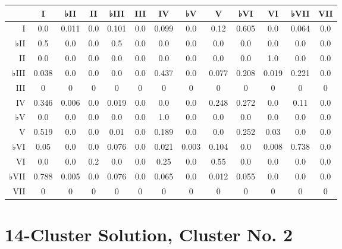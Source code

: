 \begin{table}[htbp]
\begin{minipage}{\linewidth}
\setlength{\tymax}{0.5\linewidth}
\centering
\small
\begin{tabulary}{\textwidth}{@{}RCCCCCCCCCCCC@{}} \toprule
&I&♭II&II&♭III&III&IV&♭V&V&♭VI&VI&♭VII&VII\\
\midrule
I&0.0&0.011&0.0&0.101&0.0&0.099&0.0&0.12&0.605&0.0&0.064&0.0\\
♭II&0.5&0.0&0.0&0.5&0.0&0.0&0.0&0.0&0.0&0.0&0.0&0.0\\
II&0.0&0.0&0.0&0.0&0.0&0.0&0.0&0.0&0.0&1.0&0.0&0.0\\
♭III&0.038&0.0&0.0&0.0&0.0&0.437&0.0&0.077&0.208&0.019&0.221&0.0\\
III&0&0&0&0&0&0&0&0&0&0&0&0\\
IV&0.346&0.006&0.0&0.019&0.0&0.0&0.0&0.248&0.272&0.0&0.11&0.0\\
♭V&0.0&0.0&0.0&0.0&0.0&1.0&0.0&0.0&0.0&0.0&0.0&0.0\\
V&0.519&0.0&0.0&0.01&0.0&0.189&0.0&0.0&0.252&0.03&0.0&0.0\\
♭VI&0.05&0.0&0.0&0.076&0.0&0.021&0.003&0.104&0.0&0.008&0.738&0.0\\
VI&0.0&0.0&0.2&0.0&0.0&0.25&0.0&0.55&0.0&0.0&0.0&0.0\\
♭VII&0.788&0.005&0.0&0.076&0.0&0.065&0.0&0.012&0.055&0.0&0.0&0.0\\
VII&0&0&0&0&0&0&0&0&0&0&0&0\\

\bottomrule

\end{tabulary}
\end{minipage}
\end{table}

\section{14-Cluster Solution, Cluster No. 2}
\label{14-clustersolutionclusterno.2}

